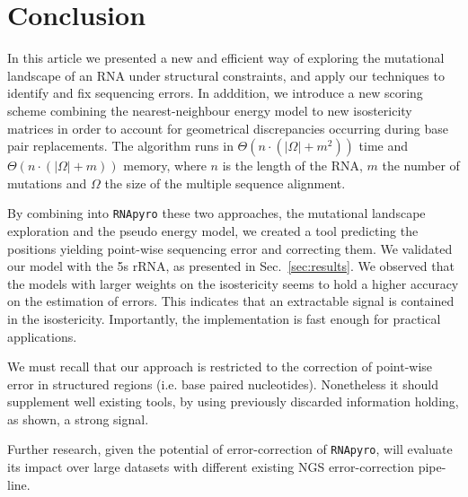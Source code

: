 \section{Conclusion}
\label{sec:conclusion}

In this article we presented a new and efficient way of exploring the mutational landscape of an RNA under structural constraints,
and apply our techniques to identify and fix sequencing errors. In adddition, we introduce a new
scoring scheme combining the nearest-neighbour energy model to new isostericity matrices in order to account for geometrical
discrepancies occurring during base pair replacements.
The algorithm runs in  $\Theta(n\cdot(|\Omega|+m^2))$ time and $\Theta(n\cdot(|\Omega|+m))$ memory, where $n$ is the length of the RNA,
$m$ the number of mutations and $\Omega$ the size of the multiple sequence alignment.


By combining  into \texttt{RNApyro} these two approaches,  the 
mutational landscape exploration and the pseudo energy model,
 we created a tool predicting the positions
 yielding point-wise sequencing error and correcting them.
We validated our model with the 5s rRNA,
as presented in Sec.~\ref{sec:results}.
We observed that the models
with larger weights on the
isostericity seems to hold a higher accuracy on the estimation of errors.
This indicates that an extractable signal is contained in the isostericity.
Importantly, the implementation is fast enough for practical applications. 


We must recall that our approach is restricted to
 the correction of point-wise error in structured regions (i.e. base paired nucleotides).
 Nonetheless it should supplement well existing tools, by using previously discarded
information holding, as shown, a strong signal.

Further research, given the potential of error-correction of \texttt{RNApyro}, 
will evaluate its impact over large datasets with different existing
  NGS error-correction pipe-line.